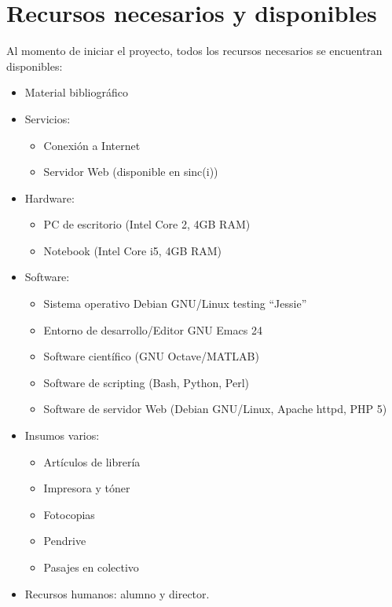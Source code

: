 \documentclass[12pt,bibliography=oldstyle,DIV=14,parskip=full-,titlepage]{scrartcl}
\begin{document}
\section{Recursos necesarios y disponibles}
Al momento de iniciar el proyecto, todos los recursos necesarios se
encuentran disponibles:
\begin{itemize}
\item Material bibliográfico
\item Servicios:
  \begin{itemize}
  \item Conexión a Internet
  \item Servidor Web (disponible en sinc(i))
  \end{itemize}
\item Hardware:
  \begin{itemize}
  \item PC de escritorio (Intel Core 2, 4GB RAM)
  \item Notebook (Intel Core i5, 4GB RAM)
  \end{itemize}
\item Software:
  \begin{itemize}
  \item Sistema operativo Debian GNU/Linux testing ``Jessie''
  \item Entorno de desarrollo/Editor GNU Emacs 24
  \item Software científico (GNU Octave/MATLAB)
  \item Software de scripting (Bash, Python, Perl)
  \item Software de servidor Web (Debian GNU/Linux, Apache
    httpd, PHP 5)
  \end{itemize}
\item Insumos varios:
  \begin{itemize}
  \item Artículos de librería
  \item Impresora y tóner
  \item Fotocopias
  \item Pendrive
  \item Pasajes en colectivo
  \end{itemize}
\item Recursos humanos: alumno y director.
\end{itemize}
%
%
\end{document}
